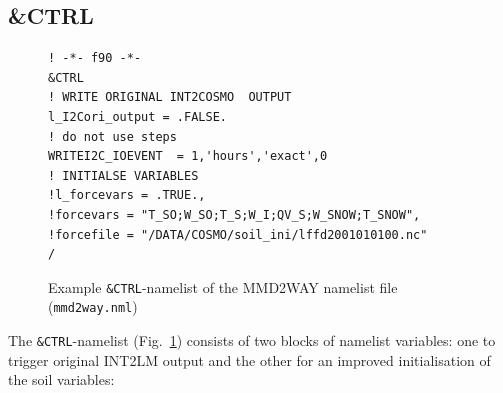 \documentclass[11pt,twoside]{article}
\newcommand{\blockcode}{\ttfamily\color{OliveGreen}\par}
\begin{document}
\subsection{\protect\&CTRL}\label{sec:nmlctrl}
\begin{figure}
\footnotesize
{\blockcode 
\begin{verbatim} 
! -*- f90 -*-
&CTRL
! WRITE ORIGINAL INT2COSMO  OUTPUT
l_I2Cori_output = .FALSE.
! do not use steps
WRITEI2C_IOEVENT  = 1,'hours','exact',0 
! INITIALSE VARIABLES
!l_forcevars = .TRUE.,
!forcevars = "T_SO;W_SO;T_S;W_I;QV_S;W_SNOW;T_SNOW",
!forcefile = "/DATA/COSMO/soil_ini/lffd2001010100.nc"
/
\end{verbatim} 
}
\vspace*{-.7cm}
\caption{Example {\tt \&CTRL}-namelist of the MMD2WAY namelist file ({\tt mmd2way.nml})} 
\label{fig:nmlctrl} 
\end{figure} 
The \verb|&CTRL|-namelist (Fig.\ \ref{fig:nmlctrl}) consists of two
blocks of namelist variables: one to trigger original INT2LM output
and the other for an improved initialisation of the soil variables:
\end{document}
